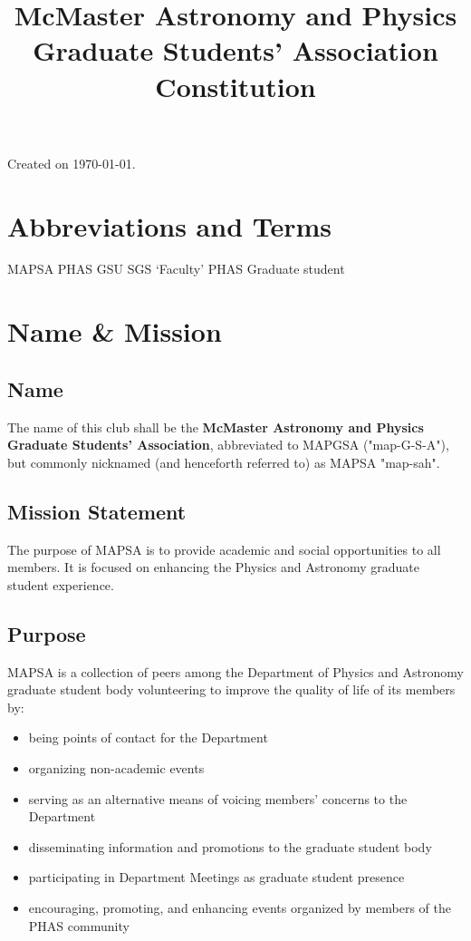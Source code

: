 \documentclass[onecolumn,aps,prd]{revtex4-2}
\begin{document}
		
\title{{McMaster Astronomy and Physics Graduate Students' Association}\\\huge{Constitution}}
\maketitle
Created on \today.
\tableofcontents
\section*{Abbreviations and Terms}

MAPSA
PHAS
GSU
SGS
`Faculty'
PHAS Graduate student
\section{Name \& Mission}
\subsection{Name}The name of this club shall be the \textbf{McMaster Astronomy and Physics Graduate Students' Association}, abbreviated to MAPGSA ("map-G-S-A"), but commonly nicknamed (and henceforth referred to) as MAPSA "map-sah".
\subsection{Mission Statement}
The purpose of MAPSA is to provide academic and social opportunities to all members. It is focused on enhancing
the Physics and Astronomy graduate student experience.
\subsection{Purpose}
MAPSA is a collection of peers among the Department of Physics and Astronomy graduate student body volunteering to improve the quality of life of its members by: 
\begin{itemize}
	\item being points of contact for the Department
	\item organizing non-academic events 
	\item serving as an alternative means of voicing members' concerns to the Department
	\item disseminating information and promotions to the graduate student body
	\item participating in Department Meetings as graduate student presence
	\item encouraging, promoting, and enhancing events organized by members of the PHAS community
\end{itemize}
\end{document}
